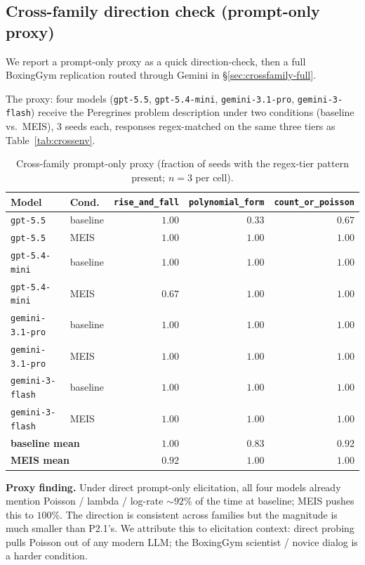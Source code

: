 \documentclass{article}
\begin{document}
\subsection{Cross-family direction check (prompt-only proxy)}
\label{sec:crossfamily-proxy}

We report a prompt-only proxy as a quick direction-check, then a
full BoxingGym replication routed through Gemini in
\S\ref{sec:crossfamily-full}.

The proxy: four models (\texttt{gpt-5.5}, \texttt{gpt-5.4-mini},
\texttt{gemini-3.1-pro}, \texttt{gemini-3-flash}) receive the
Peregrines problem description under two conditions (baseline
vs.\ MEIS), $3$ seeds each, responses regex-matched on the same
three tiers as Table~\ref{tab:crossenv}.

\begin{table}[h]
\centering
\caption{Cross-family prompt-only proxy (fraction of seeds with the
regex-tier pattern present; $n = 3$ per cell).}
\label{tab:crossfamily-proxy}
\small
\begin{tabular}{llrrr}
\toprule
Model & Cond. & \texttt{rise\_and\_fall} & \texttt{polynomial\_form} & \texttt{count\_or\_poisson} \\
\midrule
\texttt{gpt-5.5}        & baseline & $1.00$ & $0.33$ & $0.67$ \\
\texttt{gpt-5.5}        & MEIS     & $1.00$ & $1.00$ & $1.00$ \\
\texttt{gpt-5.4-mini}   & baseline & $1.00$ & $1.00$ & $1.00$ \\
\texttt{gpt-5.4-mini}   & MEIS     & $0.67$ & $1.00$ & $1.00$ \\
\texttt{gemini-3.1-pro} & baseline & $1.00$ & $1.00$ & $1.00$ \\
\texttt{gemini-3.1-pro} & MEIS     & $1.00$ & $1.00$ & $1.00$ \\
\texttt{gemini-3-flash} & baseline & $1.00$ & $1.00$ & $1.00$ \\
\texttt{gemini-3-flash} & MEIS     & $1.00$ & $1.00$ & $1.00$ \\
\midrule
\multicolumn{2}{l}{\textbf{baseline mean}} & $1.00$ & $0.83$ & $\mathbf{0.92}$ \\
\multicolumn{2}{l}{\textbf{MEIS mean}}     & $0.92$ & $1.00$ & $\mathbf{1.00}$ \\
\bottomrule
\end{tabular}
\end{table}

\textbf{Proxy finding.} Under direct prompt-only elicitation, all
four models already mention Poisson / lambda / log-rate $\sim 92\%$
of the time at baseline; MEIS pushes this to $100\%$. The
direction is consistent across families but the magnitude is much
smaller than P2.1's. We attribute this to elicitation context:
direct probing pulls Poisson out of any modern LLM; the BoxingGym
scientist / novice dialog is a harder condition.
\end{document}
